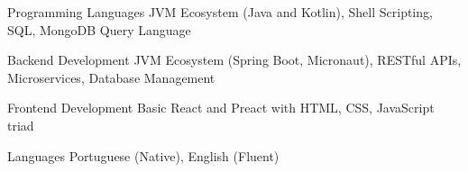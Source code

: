 


{
\begin{cvskills}


  \cvskill
  {Programming Languages} %
  {JVM Ecosystem (Java and Kotlin), Shell Scripting, SQL, MongoDB Query Language} %


  \cvskill
  {Backend Development} %
  {JVM Ecosystem (Spring Boot, Micronaut), RESTful APIs, Microservices, Database Management} %


  \cvskill
  {Frontend Development} %
  {Basic React and Preact with HTML, CSS, JavaScript triad} %


  \cvskill
  {Languages} %
  {Portuguese (Native), English (Fluent)} %


\end{cvskills}
}
